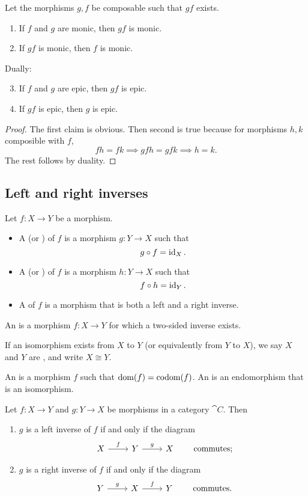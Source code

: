 \begin{lemma} \label{lemma:monicEpicCompositions}
Let the morphisms $g,f$ be composable such that $gf$ exists.
\begin{enumerate}
\item If $f$ and $g$ are monic, then $gf$ is monic.
\item If $gf$ is monic, then $f$ is monic.
\end{enumerate}
Dually:
\begin{enumerate}
\setcounter{enumi}{2}
\item If $f$ and $g$ are epic, then $gf$ is epic.
\item If $gf$ is epic, then $g$ is epic.
\end{enumerate}
\end{lemma}
\begin{proof}
The first claim is obvious. Then second is true because for morphisms $h,k$ composible with $f$,
\[ fh = fk \implies gfh = gfk \implies h = k. \]
The rest follows by duality.
\end{proof}

\subsection{Left and right inverses}
\begin{definition}
Let $f:X\to Y$ be a morphism.
\begin{itemize}
\item A  (or ) of $f$ is a morphism $g: Y\to X$ such that
\[ g\circ f = \operatorname{id}_X. \]
\item A  (or ) of $f$ is a morphism $h: Y\to X$ such that
\[ f\circ h = \operatorname{id}_Y. \]
\item A  of $f$ is a morphism that is both a left and a right inverse.
\end{itemize}
An  is a morphism $f: X\to Y$ for which a two-sided inverse exists.

If an isomorphism exists from $X$ to $Y$ (or equivalently from $Y$ to $X$), we say $X$ and $Y$ are , and write $X\cong Y$.
\end{definition}

An  is a morphism $f$ such that $\operatorname{dom}(f) = \operatorname{codom}(f)$. An  is an endomorphism that is an isomorphism.

\begin{lemma}
Let $f:X\to Y$ and $g:Y\to X$ be morphisms in a category $\cat{C}$. Then
\begin{enumerate}
\item $g$ is a left inverse of $f$ if and only if the diagram
\[ \begin{tikzcd}
X \rar{f} & Y \rar{g} & X
\end{tikzcd} \qquad \text{commutes;} \]
\item $g$ is a right inverse of $f$ if and only if the diagram
\[ \begin{tikzcd}
Y \rar{g} & X \rar{f} & Y
\end{tikzcd} \qquad \text{commutes.} \]
\end{enumerate}
\end{lemma}

